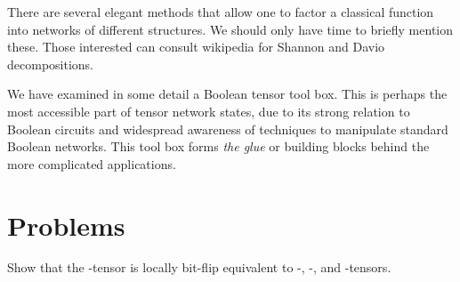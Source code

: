 \begin{remark}
 There are several elegant methods that allow one to factor a classical function into networks of different structures.  We should only have time to briefly mention these.  Those interested can consult wikipedia for Shannon and Davio decompositions.  
\end{remark}

We have examined in some detail a Boolean tensor tool box.  This is perhaps the most accessible part of tensor network states, due to its strong relation to Boolean circuits and widespread awareness of techniques to manipulate standard Boolean networks.  This tool box forms {\it the glue} or building blocks behind the more complicated applications.  

\section{Problems}

\begin{myexercise}
 Show that the \AND-tensor is locally bit-flip equivalent to \NAND-, \NOR-, and \OR-tensors.  
\end{myexercise}

